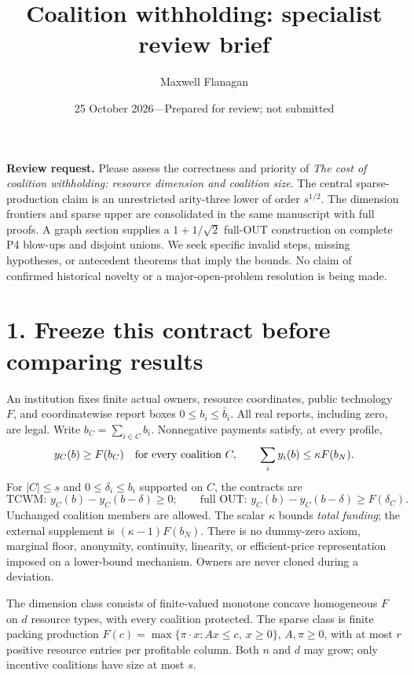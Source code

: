 \documentclass[11pt]{article}
\title{Coalition withholding: specialist review brief}
\author{Maxwell Flanagan}
\date{25 October 2026\quad---\quad Prepared for review; not submitted}
\begin{document}
\maketitle
\noindent\textbf{Review request.} Please assess the correctness and priority of
\emph{The cost of coalition withholding: resource dimension and coalition size}.
The central sparse-production claim is an unrestricted arity-three lower
of order $s^{1/2}$. The dimension frontiers and sparse upper are consolidated
in the same manuscript with full proofs. A graph section supplies a $1+1/\sqrt2$ full-OUT construction on complete P4 blow-ups
and disjoint unions. We seek
specific invalid steps, missing hypotheses, or antecedent theorems that imply
the bounds. No claim of confirmed historical novelty or a major-open-problem
resolution is being made.

\section*{1. Freeze this contract before comparing results}
An institution fixes finite actual owners, resource coordinates, public
technology $F$, and coordinatewise report boxes $0\le b_i\le\bar b_i$.
All real reports, including zero, are legal. Write $b_C=\sum_{i\in C}b_i$.
Nonnegative payments satisfy, at every profile,
\[
 y_C(b)\ge F(b_C)\quad\hbox{for every coalition }C,
 \qquad \sum_i y_i(b)\le\kappa F(b_N).
\]
For $|C|\le s$ and $0\le\delta_i\le b_i$ supported on $C$, the contracts are
\[
 \text{TCWM: } y_C(b)-y_C(b-\delta)\ge0;
 \qquad
 \text{full OUT: } y_C(b)-y_C(b-\delta)\ge F(\delta_C).
\]
Unchanged coalition members are allowed. The scalar $\kappa$ bounds
\emph{total funding}; the external supplement is $(\kappa-1)F(b_N)$.
There is no dummy-zero axiom, marginal floor, anonymity, continuity, linearity,
or efficient-price representation imposed on a lower-bound mechanism.
Owners are never cloned during a deviation.

The dimension class consists of finite-valued monotone concave homogeneous
$F$ on $d$ resource types, with every coalition protected. The sparse class is
finite packing production $F(c)=\max\{\pi\cdot x:Ax\le c,\ x\ge0\}$,
$A,\pi\ge0$, with at most $r$ positive resource entries per profitable column.
Both $n$ and $d$ may grow; only incentive coalitions have size at most $s$.
\end{document}
